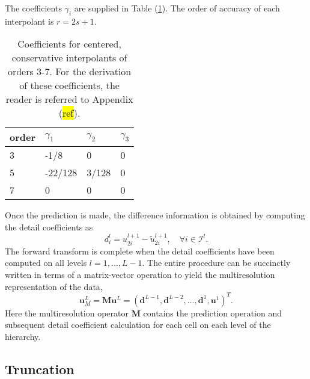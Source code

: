\documentclass[]{article}
\begin{document}
        The coefficients $\gamma_{i}$ are supplied in Table (\ref{coeff1}). The
        order of accuracy of each interpolant is $r=2s+1$.
        \begin{table}
            \center
            \begin{tabular}{|l|l|l|l|}
            \hline
                order    & $\gamma_{1}$ & $\gamma_{2}$ & $\gamma_{3}$ \\ \hline
                3 & -1/8          & 0            & 0            \\ \hline
                5 & -22/128      & 3/128        & 0            \\ \hline
                7 & 0            & 0            & 0            \\ \hline
            \end{tabular}
            \label{coeff1}
            \caption{Coefficients for centered, conservative interpolants of
                orders 3-7. For the derivation of these coefficients, the reader is referred to Appendix (\hl{ref}).}
        \end{table}
        Once the prediction is made, the difference information is
        obtained by computing the detail coefficients as
        \begin{equation}
            d^{l}_{i} = u^{l+1}_{2i} - \tilde{u}^{l+1}_{2i}, \quad \forall i \in \bm{\mathcal{I}}^{l}.
        \end{equation}
        The forward transform is complete when the detail
        coefficients have been computed on all levels $l=1,\dots,L-1$.  The
        entire procedure can be succinctly written in terms of a matrix-vector
        operation to yield the multiresolution representation of the data,
        \begin{equation}
            \bm{u}^{L}_{M} = \bm{M} \bm{u}^{L} = \left( \bm{d}^{L-1}, \bm{d}^{L-2},
            \dots, \bm{d}^{1}, \bm{u}^{1} \right)^{T}.
        \end{equation}
        Here the multiresolution operator $\bm{M}$ contains the prediction
        operation and subsequent detail coefficient calculation for each cell
        on each level of the hierarchy.

    \subsection*{Truncation}
\end{document}
